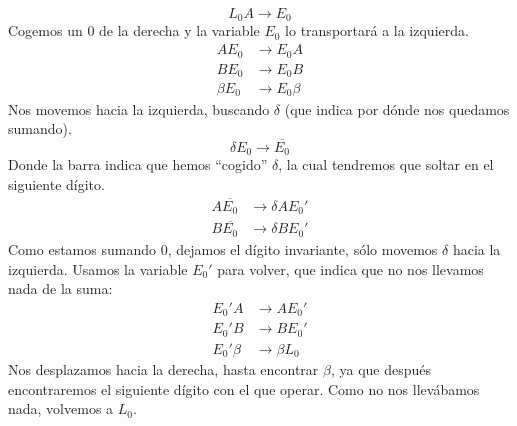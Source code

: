 \begin{ejercicio}
\begin{enumerate}
\begin{description}
\begin{itemize}
\begin{enumerate}
                                    \begin{equation*}
                                        L_0A \rightarrow E_0
                                    \end{equation*}
                                    Cogemos un 0 de la derecha y la variable $E_0$ lo transportará a la izquierda.
                                    \begin{align*}
                                        A E_0 &\rightarrow E_0 A \\
                                        B E_0 &\rightarrow E_0 B \\
                                        \beta E_0 &\rightarrow E_0 \beta
                                    \end{align*}
                                    Nos movemos hacia la izquierda, buscando $\delta$ (que indica por dónde nos quedamos sumando).
                                    \begin{equation*}
                                        \delta E_0 \rightarrow \overline{E_0}
                                    \end{equation*}
                                    Donde la barra indica que hemos ``cogido'' $\delta$, la cual tendremos que soltar en el siguiente dígito.
                                    \begin{align*}
                                        A\overline{E_0} &\rightarrow \delta A E_0' \\
                                        B\overline{E_0} &\rightarrow \delta B E_0' 
                                    \end{align*}
                                    Como estamos sumando 0, dejamos el dígito invariante, sólo movemos $\delta$ hacia la izquierda. Usamos la variable $E_0'$ para volver, que indica que no nos llevamos nada de la suma:
                                    \begin{align*}
                                        E_0' A &\rightarrow AE_0' \\
                                        E_0' B &\rightarrow BE_0' \\
                                        E_0' \beta &\rightarrow \beta L_0
                                    \end{align*}
                                    Nos desplazamos hacia la derecha, hasta encontrar $\beta$, ya que después encontraremos el siguiente dígito con el que operar. Como no nos llevábamos nada, volvemos a $L_0$.


\end{enumerate}
\end{itemize}
\end{description}
\end{enumerate}
\end{ejercicio}
